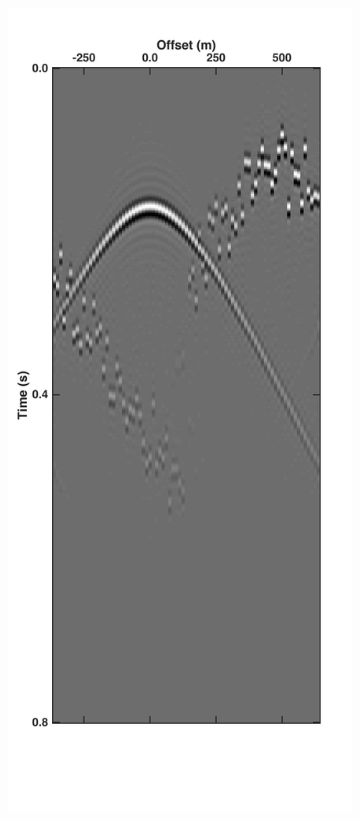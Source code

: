 \begin{figure}
\begin{subfigure}[b]{0.3\textwidth}
		\caption{}
		\label{fig:Ch-Theory-PseudoCRG-CoherentDelay}
	\end{subfigure}
	\centering
	\begin{subfigure}[b]{0.3\textwidth}
		\centering
		\includegraphics[width = \textwidth]{Plots/Mahdad/25iter/TimeDelay/Pseudo-DeblendedCRG_rec30}

\end{subfigure}
\end{figure}
